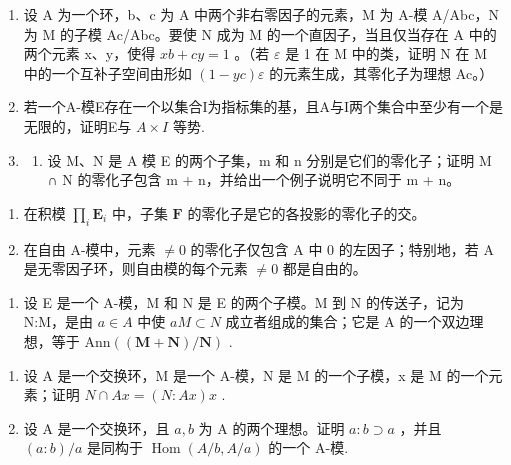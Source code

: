 \begin{enumerate}
\def\labelenumi{\arabic{enumi}.}
\setcounter{enumi}{20}
\item
  设 A 为一个环，b、c 为 A 中两个非右零因子的元素，M 为 A-模 A/Abc，N 为 M 的子模 Ac/Abc。要使 N 成为 M 的一个直因子，当且仅当存在 A 中的两个元素 x、y，使得 \(xb + cy = 1\) 。（若 \(\varepsilon\) 是 1 在 M 中的类，证明 N 在 M 中的一个互补子空间由形如 \((1 - yc)\varepsilon\) 的元素生成，其零化子为理想 Ac。）
\item
  若一个A-模E存在一个以集合I为指标集的基，且A与I两个集合中至少有一个是无限的，证明E与 \(A \times I\) 等势.
\item
  \begin{enumerate}
  \def\labelenumii{(\alph{enumii})}
  \tightlist
  \item
    设 M、N 是 A 模 E 的两个子集，m 和 n 分别是它们的零化子；证明 M ∩ N 的零化子包含 m + n，并给出一个例子说明它不同于 m + n。
  \end{enumerate}
\end{enumerate}

\begin{enumerate}
\def\labelenumi{(\alph{enumi})}
\setcounter{enumi}{1}
\item
  在积模 \(\prod_{i} \mathbf{E}_{i}\) 中，子集 \(\mathbf{F}\) 的零化子是它的各投影的零化子的交。
\item
  在自由 A-模中，元素 \(\neq0\) 的零化子仅包含 A 中 0 的左因子；特别地，若 A 是无零因子环，则自由模的每个元素 \(\neq0\) 都是自由的。
\end{enumerate}

\begin{enumerate}
\def\labelenumi{\arabic{enumi}.}
\setcounter{enumi}{23}
\tightlist
\item
  设 E 是一个 A-模，M 和 N 是 E 的两个子模。M 到 N 的传送子，记为 N:M，是由 \(a \in A\) 中使 \(aM \subset N\) 成立者组成的集合；它是 A 的一个双边理想，等于 \(\text{Ann}((\mathbf{M} + \mathbf{N})/\mathbf{N})\) .
\end{enumerate}

\begin{enumerate}
\def\labelenumi{(\alph{enumi})}
\item
  设 A 是一个交换环，M 是一个 A-模，N 是 M 的一个子模，x 是 M 的一个元素；证明 \(N \cap Ax = (N:Ax)x\) .
\item
  设 A 是一个交换环，且 \(a, b\) 为 A 的两个理想。证明 \(a:b \supset a\) ，并且 \((a:b)/a\) 是同构于 \(\operatorname{Hom}(A/b, A/a)\) 的一个 A-模.
\end{enumerate}

